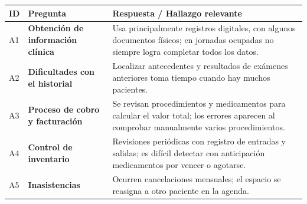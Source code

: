 \documentclass[
]{article}
\newcounter{none} %
\begin{document}
{\def\LTcaptype{none} %
\begin{longtable}[]{|
  >{\centering\arraybackslash}p{}|
  >{\raggedright\arraybackslash}p{}|
  >{\raggedright\arraybackslash}p{}|}
\hline
\begin{minipage}[b]{\linewidth}\centering
\textbf{ID}
\end{minipage} & \begin{minipage}[b]{\linewidth}\centering
\textbf{Pregunta}
\end{minipage} & \begin{minipage}[b]{\linewidth}\raggedright
\textbf{Respuesta / Hallazgo relevante}
\end{minipage} \\
\hline
\endhead
\hline
\endlastfoot
A1 & \textbf{Obtención de información clínica} &
\begin{minipage}[t]{\linewidth}\raggedright
Usa principalmente registros digitales, con algunos documentos físicos; en jornadas ocupadas no siempre logra completar todos los datos.
\end{minipage} \\
\hline
A2 & \textbf{Dificultades con el historial} &
\begin{minipage}[t]{\linewidth}\raggedright
Localizar antecedentes y resultados de exámenes anteriores toma tiempo cuando hay muchos pacientes.
\end{minipage} \\
\hline
A3 & \textbf{Proceso de cobro y facturación} &
\begin{minipage}[t]{\linewidth}\raggedright
Se revisan procedimientos y medicamentos para calcular el valor total; los errores aparecen al comprobar manualmente varios procedimientos.
\end{minipage} \\
\hline
A4 & \textbf{Control de inventario} &
\begin{minipage}[t]{\linewidth}\raggedright
Revisiones periódicas con registro de entradas y salidas; es difícil detectar con anticipación medicamentos por vencer o agotarse.
\end{minipage} \\
\hline
A5 & \textbf{Inasistencias} &
\begin{minipage}[t]{\linewidth}\raggedright
Ocurren cancelaciones mensuales; el espacio se reasigna a otro paciente en la agenda.
\end{minipage} \\

\end{longtable}}
\end{document}
